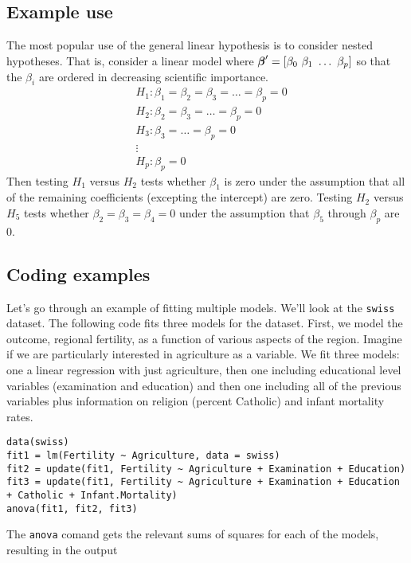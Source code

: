 \subsection{Example use}
The most popular use of the general linear hypothesis is to consider nested hypotheses. 
That is, consider a linear model where $\boldsymbol{\beta}' = [\beta_0 ~ \beta_1 ~ \ldots ~\beta_p]$
so that the $\beta_i$ are ordered in decreasing scientific importance.
\begin{align*}
 & H_1 : \beta_1  = \beta_2  = \beta_3 = \ldots = \beta_p = 0 \\
 & H_2 :            \beta_2  = \beta_3 = \ldots = \beta_p = 0 \\
 & H_3 :                       \beta_3 = \ldots = \beta_p = 0 \\
 & \vdots \\
 & H_p : \beta_p = 0
\end{align*}
Then testing $H_1$ versus $H_2$ tests whether $\beta_1$ is zero under the assumption
that all of the remaining coefficients (excepting the intercept) are zero. 
Testing $H_2$ versus $H_5$ tests whether $\beta_2 = \beta_3 = \beta_4 = 0$
under the assumption that $\beta_5$ through $\beta_p$ are 0. 

\subsection{Coding examples}
Let's go through an example of fitting multiple models. We'll look
at the \texttt{swiss} dataset.  The following code fits three models
for the dataset. First, we model the outcome, regional fertility,
as a function of various aspects of the region. Imagine if we
are particularly interested in agriculture as a variable. We
fit three models: one a linear regression with just agriculture,
then one including educational level variables (examination and education) and
then one including all of the previous variables plus information on religion (percent Catholic)
and infant mortality rates.

\begin{verbatim}
data(swiss)
fit1 = lm(Fertility ~ Agriculture, data = swiss)
fit2 = update(fit1, Fertility ~ Agriculture + Examination + Education)
fit3 = update(fit1, Fertility ~ Agriculture + Examination + Education + Catholic + Infant.Mortality)
anova(fit1, fit2, fit3)
\end{verbatim}

The \texttt{anova} comand gets the relevant sums of squares for each of the models, resulting in the
output

